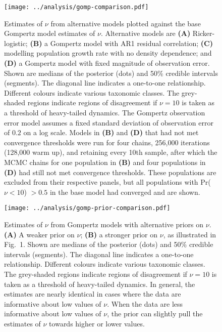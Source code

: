 \documentclass[12pt]{article}
\begin{document}
\begin{figure}[htbp]
\begin{center}
\texttt{[image: ../analysis/gomp-comparison.pdf]}

\caption{Estimates of $\nu$ from alternative models plotted against the
    base Gompertz model estimates of $\nu$. Alternative models are \textbf{(A)}
    Ricker-logistic; \textbf{(B)} a Gompertz model with AR1 residual correlation;
    \textbf{(C)} modelling population growth rate with no density dependence; and
    \textbf{(D)} a Gompertz model with fixed magnitude of observation error. Shown
are medians of the posterior (dots) and 50\% credible intervals (segments). The
diagonal line indicates a one-to-one relationship. Different colours indicate
various taxonomic classes. The grey-shaded regions indicate regions of
disagreement if $\nu = 10$ is taken as a threshold of heavy-tailed dynamics.
The Gompertz observation error model assumes a fixed standard deviation of
observation error of $0.2$ on a log scale. Models in \textbf{(B)} and \textbf{(D)}
that had not met convergence thresholds were run for four chains, 256,000 iterations (128,000 warm up), and retaining every 10th sample, after which the MCMC chains for one population in \textbf{(B)} and four populations in \textbf{(D)} had still not met convergence thresholds. These populations are excluded from their respective panels, but all populations with Pr($\nu < 10$) $> 0.5$ in the base model had converged and are shown.}

\label{fig:alt}
\end{center}
\end{figure}

\clearpage

\begin{figure}[htbp]
\begin{center}
\texttt{[image: ../analysis/gomp-prior-comparison.pdf]}

\caption{Estimates of $\nu$ from Gompertz models with alternative priors on $\nu$. \textbf{(A)} A weaker prior on $\nu$; \textbf{(B)} a stronger prior on $\nu$, as illustrated in Fig.~1. Shown are medians of the posterior (dots) and 50\% credible intervals (segments). The diagonal line indicates a one-to-one relationship. Different colours indicate various taxonomic classes. The grey-shaded regions indicate regions of disagreement if $\nu = 10$ is taken as a threshold of heavy-tailed dynamics. In general, the estimates are nearly identical in cases where the data are informative about low values of $\nu$. When the data are less informative about low values of $\nu$, the prior can slightly pull the estimates of $\nu$ towards higher or lower values.}

\label{fig:alt-priors}
\end{center}
\end{figure}
\end{document}
